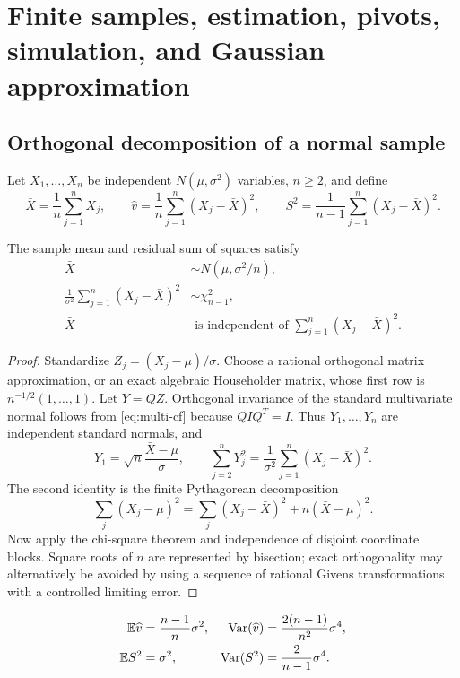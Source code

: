 \section{Finite samples, estimation, pivots, simulation, and Gaussian approximation}\label{sec:statistics}

\subsection{Orthogonal decomposition of a normal sample}

Let $X_1,\dots,X_n$ be independent $N(\mu,\sigma^2)$ variables, $n\ge2$, and define
\[
 \bar X=\frac1n\sum_{j=1}^nX_j,
 \qquad
 \widehat v=\frac1n\sum_{j=1}^n(X_j-\bar X)^2,
 \qquad
 S^2=\frac1{n-1}\sum_{j=1}^n(X_j-\bar X)^2.
\]

\begin{theorem}\label{thm:sample-decomposition}
The sample mean and residual sum of squares satisfy
\begin{align}
 \bar X&\sim N(\mu,\sigma^2/n),\label{eq:mean-law}\\
 \frac1{\sigma^2}\sum_{j=1}^n(X_j-\bar X)^2&\sim\chi_{n-1}^2,\label{eq:residual-chi}\\
 \bar X&\text{ is independent of }\sum_{j=1}^n(X_j-\bar X)^2.\label{eq:mean-var-independence}
\end{align}
\end{theorem}

\begin{proof}
Standardize $Z_j=(X_j-\mu)/\sigma$.  Choose a rational orthogonal matrix approximation, or an exact algebraic Householder matrix, whose first row is
$n^{-1/2}(1,\dots,1)$.  Let $Y=QZ$.  Orthogonal invariance of the standard multivariate normal follows from \eqref{eq:multi-cf} because $QIQ^T=I$.  Thus $Y_1,\dots,Y_n$ are independent standard normals, and
\[
 Y_1=\sqrt n\frac{\bar X-\mu}{\sigma},
 \qquad
 \sum_{j=2}^nY_j^2=\frac1{\sigma^2}
  \sum_{j=1}^n(X_j-\bar X)^2.
\]
The second identity is the finite Pythagorean decomposition
\[
 \sum_j(X_j-\mu)^2=
 \sum_j(X_j-\bar X)^2+n(\bar X-\mu)^2.
\]
Now apply the chi-square theorem and independence of disjoint coordinate blocks.  Square roots of $n$ are represented by bisection; exact orthogonality may alternatively be avoided by using a sequence of rational Givens transformations with a controlled limiting error.
\end{proof}

\begin{corollary}\label{cor:sample-variance-moments}
\begin{align}
 \mathbb E\widehat v&=\frac{n-1}{n}\sigma^2,
 &\operatorname{Var}(\widehat v)&=\frac{2(n-1)}{n^2}\sigma^4,\label{eq:mle-var-moments}\\
 \mathbb E S^2&=\sigma^2,
 &\operatorname{Var}(S^2)&=\frac{2}{n-1}\sigma^4.\label{eq:unbiased-var-moments}
\end{align}
\end{corollary}

